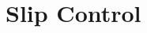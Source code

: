 \section{Slip Control}
%
\begin{figure}[ht!]
    \centering
    \caption{}
    \label{fig:SlipControl}
\end{figure}
%